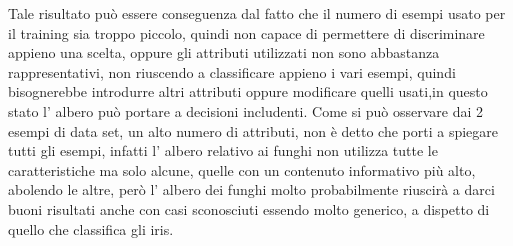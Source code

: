 	    Tale risultato può essere conseguenza dal fatto che il numero di esempi usato per il training sia troppo piccolo, quindi non capace di permettere di discriminare appieno una scelta, oppure gli attributi utilizzati non sono abbastanza rappresentativi, non riuscendo a classificare appieno i vari esempi, quindi bisognerebbe introdurre altri attributi oppure modificare quelli usati,in questo stato l' albero può portare a decisioni includenti.
	    \medskip
	    \newline
	    Come si può osservare dai 2 esempi di data set, un alto numero di attributi, non è detto che porti a spiegare tutti gli esempi, infatti l' albero relativo ai funghi non utilizza tutte le caratteristiche ma solo alcune, quelle con un contenuto informativo più alto, abolendo le altre, però l' albero dei funghi molto probabilmente riuscirà a darci buoni risultati anche con casi sconosciuti essendo molto generico, a dispetto di quello che classifica gli iris.
